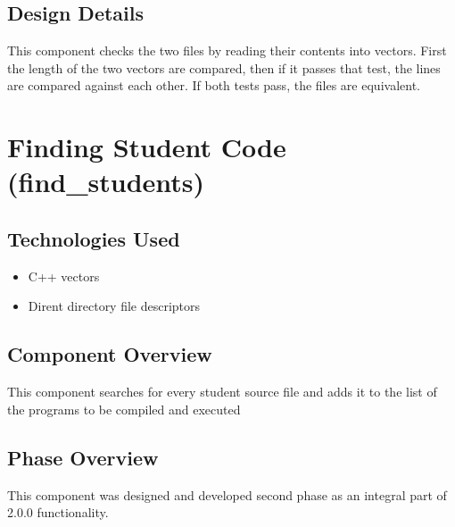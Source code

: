 

\subsection{Design Details}
This component checks the two files by reading their contents into vectors. First the length of the two vectors are compared, then if it passes that test, the lines are compared against each other. If both tests pass, the files are equivalent.

\section{Finding Student Code (find\_students)}

\subsection{Technologies  Used}
\begin{itemize}
\item C++ vectors
\item Dirent directory file descriptors
\end{itemize}

\subsection{Component  Overview}
This component searches for every student source file and adds it to the list of the programs to be compiled and executed

\subsection{Phase Overview}
This component was designed and developed second phase as an integral part of 2.0.0 functionality.

